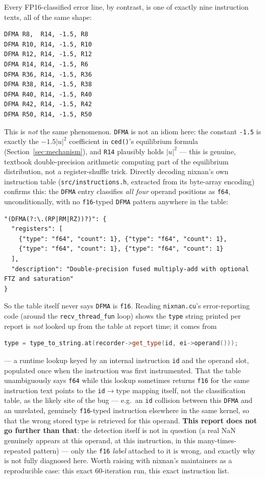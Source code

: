 \documentclass[11pt,a4paper]{article}
\begin{document}
Every FP16-classified error line, by contrast, is one of exactly nine
instruction texts, all of the same shape:
\begin{lstlisting}
DFMA R8,  R14, -1.5, R8
DFMA R10, R14, -1.5, R10
DFMA R12, R14, -1.5, R12
DFMA R14, R14, -1.5, R6
DFMA R36, R14, -1.5, R36
DFMA R38, R14, -1.5, R38
DFMA R40, R14, -1.5, R40
DFMA R42, R14, -1.5, R42
DFMA R50, R14, -1.5, R50
\end{lstlisting}
This is \emph{not} the same phenomenon. \texttt{DFMA} is not an idiom
here: the constant \texttt{-1.5} is exactly the $-1.5|u|^2$ coefficient
in \texttt{ced()}'s equilibrium formula (Section~\ref{sec:mechanism}), and
\texttt{R14} plausibly holds $|u|^2$ --- this is genuine, textbook
double-precision arithmetic computing part of the equilibrium
distribution, not a register-shuffle trick. Directly decoding nixnan's
own instruction table (\texttt{src/instructions.h}, extracted from its
byte-array encoding) confirms this: the \texttt{DFMA} entry classifies
\emph{all four} operand positions as \texttt{f64}, unconditionally, with
no \texttt{f16}-typed \texttt{DFMA} pattern anywhere in the table:
\begin{lstlisting}
"(DFMA(?:\.(RP|RM|RZ))?)": {
  "registers": [
    {"type": "f64", "count": 1}, {"type": "f64", "count": 1},
    {"type": "f64", "count": 1}, {"type": "f64", "count": 1}
  ],
  "description": "Double-precision fused multiply-add with optional FTZ and saturation"
}
\end{lstlisting}
So the table itself never says \texttt{DFMA} is \texttt{f16}. Reading
\texttt{nixnan.cu}'s error-reporting code (around the
\texttt{recv\_thread\_fun} loop) shows the \texttt{type} string printed
per report is \emph{not} looked up from the table at report time; it
comes from
\begin{lstlisting}[language=C++]
type = type_to_string.at(recorder->get_type(id, ei->operand()));
\end{lstlisting}
--- a runtime lookup keyed by an internal instruction \texttt{id} and the
operand slot, populated once when the instruction was first instrumented.
That the table unambiguously says \texttt{f64} while this lookup
sometimes returns \texttt{f16} for the same instruction text points to
the \texttt{id}$\to$type mapping itself, not the classification table, as
the likely site of the bug --- e.g.\ an \texttt{id} collision between this
\texttt{DFMA} and an unrelated, genuinely \texttt{f16}-typed instruction
elsewhere in the same kernel, so that the wrong stored type is retrieved
for this operand. \textbf{This report does not go further than that}: the
detection itself is not in question (a real NaN genuinely appears at this
operand, at this instruction, in this many-times-repeated pattern) ---
only the \texttt{f16} \emph{label} attached to it is wrong, and exactly why
is not fully diagnosed here. Worth raising with nixnan's maintainers as a
reproducible case: this exact 60-iteration run, this exact instruction
list.
\end{document}
